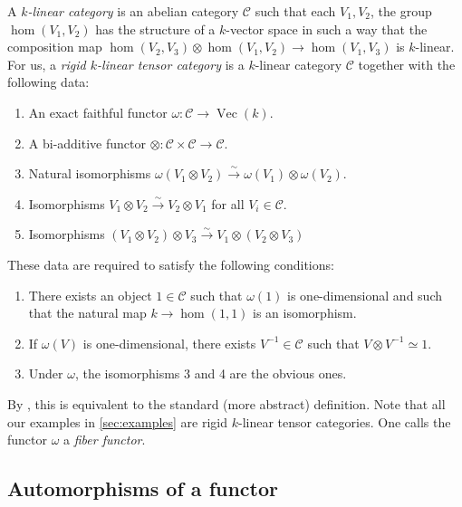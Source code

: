 \documentclass{article}
\DeclareMathOperator{\vect}{Vec}
\newcommand{\cC}{\mathcal{C}}
\newcommand{\iso}{\xrightarrow\sim}
\begin{document}
A \emph{$k$-linear category} is an abelian category $\cC$ such that each 
$V_1,V_2$, the group $\hom(V_1,V_2)$ has the structure of a $k$-vector space 
in such a way that the composition map 
$\hom(V_2,V_3)\otimes \hom(V_1,V_2)\to \hom(V_1,V_3)$ is $k$-linear. For us, 
a \emph{rigid $k$-linear tensor category} is a $k$-linear category $\cC$ 
together with the following data:
\begin{enumerate}
\item An exact faithful functor $\omega:\cC\to \vect(k)$. 
\item A bi-additive functor $\otimes:\cC\times \cC\to \cC$. 
\item Natural isomorphisms 
$\omega(V_1\otimes V_2)\iso \omega(V_1)\otimes \omega(V_2)$. 
\item Isomorphisms $V_1\otimes V_2\iso V_2\otimes V_1$ for all $V_i\in \cC$. 
\item Isomorphisms $(V_1\otimes V_2)\otimes V_3\iso V_1\otimes (V_2\otimes V_3)$
\end{enumerate}
These data are required to satisfy the following conditions:
\begin{enumerate}
\item There exists an object $1\in \cC$ such that $\omega(1)$ is 
one-dimensional and such that the natural map $k\to \hom(1,1)$ is an 
isomorphism. 
\item If $\omega(V)$ is one-dimensional, there exists $V^{-1}\in \cC$ such 
that $V\otimes V^{-1}\simeq 1$. 
\item Under $\omega$, the isomorphisms 3 and 4 are the obvious ones. 
\end{enumerate}

By \cite[Pr.~1.20]{deligne-milne-1982}, this is equivalent to the standard 
(more abstract) definition. Note that all our examples in 
\autoref{sec:examples} are rigid $k$-linear tensor categories. One calls the 
functor $\omega$ a \emph{fiber functor}. 


\subsection{Automorphisms of a functor}
\end{document}
